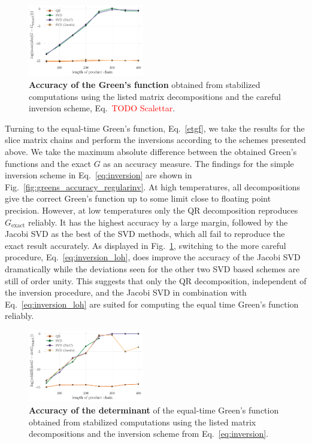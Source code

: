 \documentclass[%
 reprint,
superscriptaddress,
showpacs,
 amsmath,amssymb,
 aps,
 prb,
longbibliography,
]{revtex4-1}
\begin{document}
\begin{figure}[t]
	\includegraphics[width=0.45\textwidth]{../notebooks/accuracy_greens_svd_loh.pdf}
	\caption{\textbf{Accuracy of the Green's function} obtained from stabilized computations using the listed matrix decompositions and the careful inversion scheme, Eq.~\textcolor{red}{TODO Scalettar}. \label{fig:greens_accuracy_loh}}
\end{figure}

Turning to the equal-time Green's function, Eq.~\eqref{etgf}, we take the results for the slice matrix chains and perform the inversions according to the schemes presented above. We take the maximum absolute difference between the obtained Green's functions and the exact $G$ as an accuracy measure. The findings for the simple inversion scheme in Eq.~\ref{eq:inversion} are shown in Fig.~\ref{fig:greens_accuracy_regularinv}. At high temperatures, all decompositions give the correct Green's function up to some limit close to floating point precision. However, at low temperatures only the QR decomposition reproduces $G_{\textrm{exact}}$ reliably. It has the highest accuracy by a large margin, followed by the Jacobi SVD as the best of the SVD methods, which all fail to reproduce the exact result accurately. As displayed in Fig.~\ref{fig:greens_accuracy_loh}, switching to the more careful procedure, Eq.~\ref{eq:inversion_loh}, does improve the accuracy of the Jacobi SVD dramatically while the deviations seen for the other two SVD based schemes are still of order unity. This suggests that only the QR decomposition, independent of the inversion procedure, and the Jacobi SVD in combination with Eq.~\ref{eq:inversion_loh} are suited for computing the equal time Green's function reliably.


\begin{figure}[b]
	\includegraphics[width=0.45\textwidth]{../notebooks/accuracy_det_svd_regularinv.pdf}
	\caption{\textbf{Accuracy of the determinant} of the equal-time Green's function obtained from stabilized computations using the listed matrix decompositions and the inversion scheme from Eq.~\eqref{eq:inversion}. \label{fig:det_accuracy_regularinv}}
\end{figure}
\end{document}
